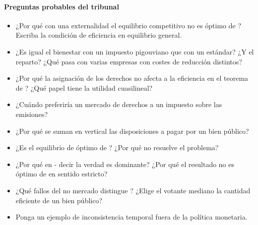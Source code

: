 \documentclass[11pt]{article}
\begin{document}
\paragraph{Preguntas probables del tribunal}
\begin{itemize}
\item ¿Por qué con una externalidad el equilibrio competitivo no es óptimo de ? Escriba la condición de eficiencia en equilibrio general.
\item ¿Es igual el bienestar con un impuesto pigouviano que con un estándar? ¿Y el reparto? ¿Qué pasa con varias empresas con costes de reducción distintos?
\item ¿Por qué la asignación de los derechos no afecta a la eficiencia en el teorema de ? ¿Qué papel tiene la utilidad cuasilineal?
\item ¿Cuándo preferiría un mercado de derechos a un impuesto sobre las emisiones?
\item ¿Por qué se suman en vertical las disposiciones a pagar por un bien público?
\item ¿Es el equilibrio de  óptimo de ? ¿Por qué no resuelve el problema?
\item ¿Por qué en - decir la verdad es dominante? ¿Por qué el resultado no es óptimo de  en sentido estricto?
\item ¿Qué fallos del no mercado distingue ? ¿Elige el votante mediano la cantidad eficiente de un bien público?
\item Ponga un ejemplo de inconsistencia temporal fuera de la política monetaria.
\end{itemize}

\bibliografia
\end{document}

